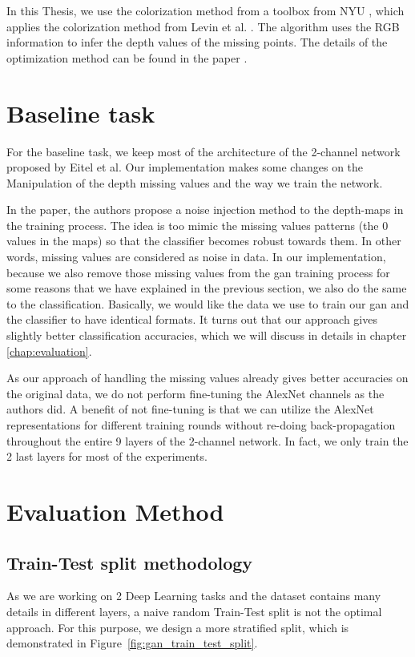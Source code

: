 In this Thesis, we use the colorization method from a toolbox from NYU \cite{nyu_dataset},
which applies the colorization method from Levin et al. \cite{levin_colorization}. The algorithm
uses the RGB information to infer the depth values of the missing points. The
details of the optimization method can be found in the paper \cite{levin_colorization}.

\section{Baseline task}
For the baseline task, we keep most of the architecture of the 2-channel network proposed
by Eitel et al. Our implementation makes some changes on the Manipulation of the depth
missing values and the way we train the network.

In the paper, the authors propose a noise injection method to the depth-maps in the
training process. The idea is too mimic the missing values patterns (the 0 values in the
maps) so that the classifier becomes robust towards them. In other words, missing values
are considered as noise in data. In our implementation, because we also remove those
missing values from the \acrshort{gan} training process for some reasons that we have
explained in the previous section, we also do the same to the classification. Basically,
we would like the data we use to train our \acrshort{gan} and the classifier to have
identical formats. It turns out that our approach gives slightly better classification
accuracies, which we will discuss in details in chapter \ref{chap:evaluation}.

As our approach of handling the missing values already gives better accuracies on the
original data, we do not perform fine-tuning the AlexNet channels as the authors did. A
benefit of not fine-tuning is that we can utilize the AlexNet representations for
different training rounds without re-doing back-propagation throughout the entire 9 layers
of the 2-channel network. In fact, we only train the 2 last layers for most of the
experiments.

\section{Evaluation Method}
\subsection{Train-Test split methodology\label{sec:train_test_split}}
As we are working on 2 Deep Learning tasks and the dataset contains many details in
different layers, a naive random Train-Test split is not the optimal approach. For this
purpose, we design a more stratified split, which is demonstrated in
Figure~\ref{fig:gan_train_test_split}.

